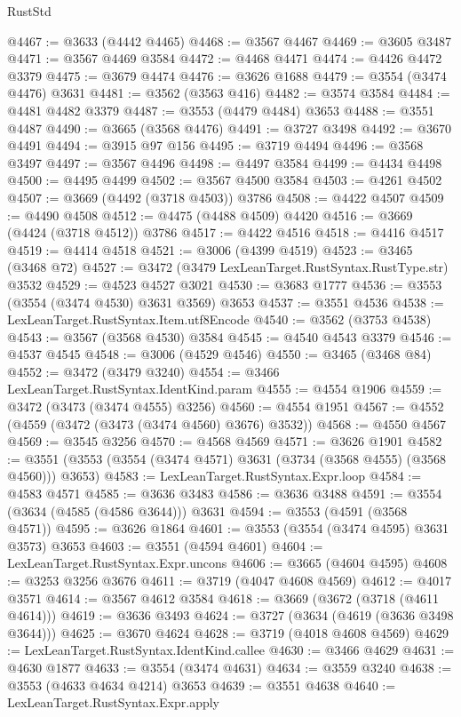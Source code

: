 \begin{lexlean}{RustStd}
\begin{coremodule}
@4467 := @3633 (@4442 @4465)
@4468 := @3567 @4467
@4469 := @3605 @3487
@4471 := @3567 @4469 @3584
@4472 := @4468 @4471
@4474 := @4426 @4472 @3379
@4475 := @3679 @4474
@4476 := @3626 @1688
@4479 := @3554 (@3474 @4476) @3631
@4481 := @3562 (@3563 @416)
@4482 := @3574 @3584
@4484 := @4481 @4482 @3379
@4487 := @3553 (@4479 @4484) @3653
@4488 := @3551 @4487
@4490 := @3665 (@3568 @4476)
@4491 := @3727 @3498
@4492 := @3670 @4491
@4494 := @3915 @97 @156
@4495 := @3719 @4494
@4496 := @3568 @3497
@4497 := @3567 @4496
@4498 := @4497 @3584
@4499 := @4434 @4498
@4500 := @4495 @4499
@4502 := @3567 @4500 @3584
@4503 := @4261 @4502
@4507 := @3669 (@4492 (@3718 @4503)) @3786
@4508 := @4422 @4507
@4509 := @4490 @4508
@4512 := @4475 (@4488 @4509) @4420
@4516 := @3669 (@4424 (@3718 @4512)) @3786
@4517 := @4422 @4516
@4518 := @4416 @4517
@4519 := @4414 @4518
@4521 := @3006 (@4399 @4519)
@4523 := @3465 (@3468 @72)
@4527 := @3472 (@3479 LexLeanTarget.RustSyntax.RustType.str) @3532
@4529 := @4523 @4527 @3021
@4530 := @3683 @1777
@4536 := @3553 (@3554 (@3474 @4530) @3631 @3569) @3653
@4537 := @3551 @4536
@4538 := LexLeanTarget.RustSyntax.Item.utf8Encode
@4540 := @3562 (@3753 @4538)
@4543 := @3567 (@3568 @4530) @3584
@4545 := @4540 @4543 @3379
@4546 := @4537 @4545
@4548 := @3006 (@4529 @4546)
@4550 := @3465 (@3468 @84)
@4552 := @3472 (@3479 @3240)
@4554 := @3466 LexLeanTarget.RustSyntax.IdentKind.param
@4555 := @4554 @1906
@4559 := @3472 (@3473 (@3474 @4555) @3256)
@4560 := @4554 @1951
@4567 := @4552 (@4559 (@3472 (@3473 (@3474 @4560) @3676) @3532))
@4568 := @4550 @4567
@4569 := @3545 @3256
@4570 := @4568 @4569
@4571 := @3626 @1901
@4582 := @3551 (@3553 (@3554 (@3474 @4571) @3631 (@3734 (@3568 @4555) (@3568 @4560))) @3653)
@4583 := LexLeanTarget.RustSyntax.Expr.loop
@4584 := @4583 @4571
@4585 := @3636 @3483
@4586 := @3636 @3488
@4591 := @3554 (@3634 (@4585 (@4586 @3644))) @3631
@4594 := @3553 (@4591 (@3568 @4571))
@4595 := @3626 @1864
@4601 := @3553 (@3554 (@3474 @4595) @3631 @3573) @3653
@4603 := @3551 (@4594 @4601)
@4604 := LexLeanTarget.RustSyntax.Expr.uncons
@4606 := @3665 (@4604 @4595)
@4608 := @3253 @3256 @3676
@4611 := @3719 (@4047 @4608 @4569)
@4612 := @4017 @3571
@4614 := @3567 @4612 @3584
@4618 := @3669 (@3672 (@3718 (@4611 @4614)))
@4619 := @3636 @3493
@4624 := @3727 (@3634 (@4619 (@3636 @3498 @3644)))
@4625 := @3670 @4624
@4628 := @3719 (@4018 @4608 @4569)
@4629 := LexLeanTarget.RustSyntax.IdentKind.callee
@4630 := @3466 @4629
@4631 := @4630 @1877
@4633 := @3554 (@3474 @4631)
@4634 := @3559 @3240
@4638 := @3553 (@4633 @4634 @4214) @3653
@4639 := @3551 @4638
@4640 := LexLeanTarget.RustSyntax.Expr.apply

\end{coremodule}
\end{lexlean}
